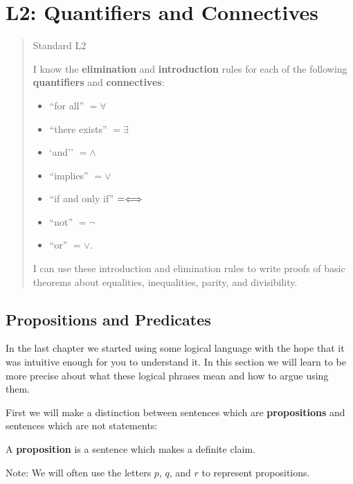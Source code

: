 \chapter{L2:  Quantifiers and Connectives}

\begin{quote}
		\begin{center}
			Standard L2
			\end{center}
		
		I know the \textbf{elimination} and \textbf{introduction} rules for each of the following \textbf{quantifiers} and \textbf{connectives}:  
		\begin{itemize}
		\item ``for all'' $=\forall$
		\item ``there exists'' $ = \exists$
		\item `and'' $=\wedge$
		\item ``implies'' $= \vee$
		\item ``if and only if'' $=\Longleftrightarrow$
		\item ``not'' $=\neg$
		\item  ``or'' $=\vee$.
		\end{itemize}
		
		I can use these introduction and elimination rules to write proofs of basic theorems about equalities, inequalities, parity, and divisibility. 
	\end{quote}

\section{Propositions and Predicates}
In the last chapter we started using some logical language with the hope that it was intuitive enough for you to understand it.  In this section we will learn to be more precise about what these logical phrases mean and how to argue using them.

First we will make a distinction between sentences which are  \textbf{propositions} and sentences which are not statements:

\begin{definition}
		A \textbf{proposition} is a sentence which makes a definite claim. 
	\end{definition}

Note:  We will often use the letters $p$, $q$, and $r$ to represent propositions.

